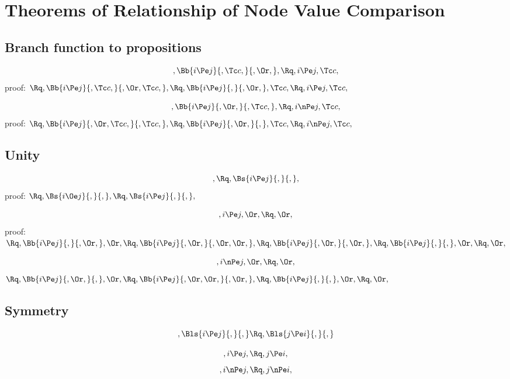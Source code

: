 
 \chapter{Theorems of Relationship of Node Value Comparison}
 \section{Branch function to propositions}
 \[, \Bb{i  \Pe j}{, \Tc c,}{, \Or,},  \Rq ,i  \Pe j,  \Tc c, \]
 proof:
 \begin{math}
    \Rq, \Bb{i  \Pe j}{, \Tc c,}{, \Or, \Tc c,},
    \Rq, \Bb{i  \Pe j}{,}{, \Or,}, \Tc c,
    \Rq, i  \Pe j, \Tc c,
 \end{math}

 \[, \Bb{i  \Pe j}{, \Or,}{, \Tc c,},  \Rq ,i  \nPe j,  \Tc c, \]
 proof:
 \begin{math}
    \Rq, \Bb{i  \Pe j}{, \Or,  \Tc c,}{, \Tc c,},
    \Rq, \Bb{i  \Pe j}{, \Or,}{,}, \Tc c,
    \Rq, i  \nPe j,  \Tc c,
 \end{math}

 \section{Unity}
 \[,  \Rq ,  \Bs{i  \Pe j}{,}{,}, \]
 proof:
 \begin{math}
    \Rq , \Bs{i  \Oe j}{,}{,}, 
    \Rq , \Bs{i  \Pe j}{,}{,},
 \end{math}

 \[, i  \Pe j,  \Or,  \Rq ,  \Or, \]
proof:  \\
\begin{math} 
 \Rq, \Bb{i  \Pe j}{,}{, \Or,},  \Or, 
 \Rq, \Bb{i  \Pe j}{,\Or, }{, \Or,\Or, }, 
 \Rq, \Bb{i  \Pe j}{,\Or,}{,\Or,},
 \Rq, \Bb{i  \Pe j}{,}{,},\Or,
 \Rq, \Or,
\end{math}


 \[, i  \nPe j,  \Or,  \Rq ,  \Or, \]
 \begin{math} 
   \Rq, \Bb{i  \Pe j}{, \Or,}{,},  \Or, 
   \Rq, \Bb{i  \Pe j}{, \Or, \Or,}{, \Or,},  
   \Rq, \Bb{i  \Pe j}{,}{,}, \Or,
   \Rq, \Or,
\end{math}

 \section{Symmetry}
 \[,  \Bls{i \Pe j}{,}{,}  \Rq ,  \Bls{j  \Pe i}{,}{,}  \]

 \[, i  \Pe j,  \Rq , j  \Pe i, \]
 \[, i  \nPe j,  \Rq , j  \nPe i, \]



